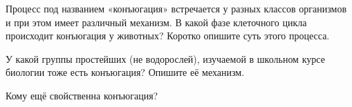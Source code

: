 
Процесс под названием «конъюгация» встречается у разных классов организмов и при этом имеет различный механизм. В какой фазе клеточного цикла происходит конъюгация у животных? Коротко опишите суть этого процесса.

У какой группы простейших (не водорослей), изучаемой в школьном курсе биологии тоже есть конъюгация? Опишите её механизм. 

Кому ещё свойственна конъюгация?